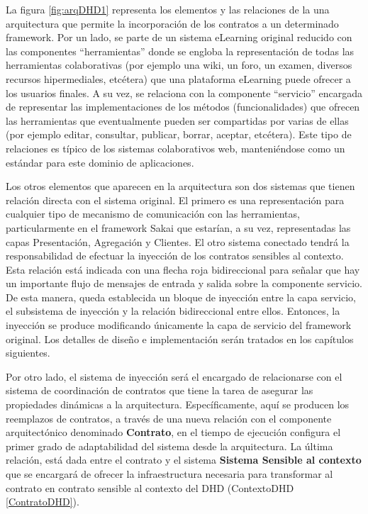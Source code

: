 La figura \ref{fig:arqDHD1} representa los elementos y las relaciones de la una arquitectura que permite la incorporación de los contratos a un determinado framework. Por un lado, se parte de un sistema eLearning original reducido con las componentes “herramientas” donde se engloba la representación de todas las herramientas colaborativas (por ejemplo  una wiki, un foro, un examen, diversos recursos hipermediales, etcétera) que una plataforma eLearning puede ofrecer a los usuarios finales. A su vez, se relaciona con la componente “servicio” encargada de representar las implementaciones de los métodos (funcionalidades) que ofrecen las herramientas que eventualmente pueden ser compartidas por varias de ellas (por ejemplo editar, consultar, publicar, borrar, aceptar, etcétera). Este tipo de relaciones es típico de los sistemas colaborativos web, manteniéndose como un estándar para este dominio de aplicaciones. 

Los otros elementos que aparecen en la arquitectura son dos sistemas que tienen relación directa con el sistema original. El primero es una representación para cualquier tipo de mecanismo de comunicación con las herramientas, particularmente en el framework Sakai \cite{sakaimanual} que estarían, a su vez, representadas las capas Presentación, Agregación y Clientes. El otro sistema conectado tendrá la responsabilidad de efectuar la inyección de los contratos sensibles al contexto. Esta relación está indicada con una flecha roja bidireccional para señalar que hay un importante flujo de mensajes de entrada y salida sobre la componente servicio. De esta manera, queda establecida un bloque de inyección entre la capa servicio, el subsistema de inyección y la relación bidireccional entre ellos. Entonces, la inyección se produce modificando únicamente la capa de servicio del framework original. Los detalles de diseño e implementación serán tratados en los capítulos siguientes.

Por otro lado, el sistema de inyección será el encargado de relacionarse con el sistema de coordinación de contratos que tiene la tarea de asegurar las propiedades dinámicas a la arquitectura. Específicamente, aquí se producen los reemplazos de contratos, a través de una nueva relación con el componente arquitectónico denominado \textbf{Contrato}, en el tiempo de ejecución configura el primer grado de adaptabilidad del sistema desde la arquitectura. La última relación, está dada entre el contrato y el sistema \textbf{Sistema Sensible al contexto} que se encargará de ofrecer la infraestructura necesaria para transformar al contrato en contrato sensible al contexto del DHD (ContextoDHD \ref{ContratoDHD}). 



